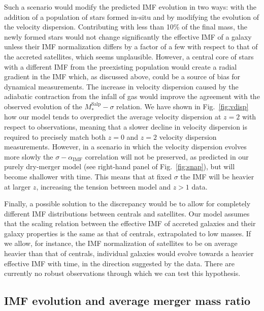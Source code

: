 \documentclass[usenatbib]{mnras}
\def\msalp{M_*^{\mathrm{Salp}}}
\def\aimf{\alpha_{\mathrm{IMF}}}
\def\Fref#1{Fig.~\ref{#1}\xspace}
\begin{document}
Such a scenario would modify the predicted IMF
evolution in two ways: with the addition of a population of stars
formed in-situ and by modifying the evolution of the velocity
dispersion.  Contributing with less than 10\% of the final mass, the
newly formed stars would not change significantly the effective IMF of
a galaxy unless their IMF normalization differs by a factor of a few
with respect to that of the accreted satellites, which seems
unplausible. However, a central core of stars with a different IMF
from the preexisting population would create a radial gradient in the
IMF which, as discussed above, could be a source of bias for dynamical
measurements.  The increase in velocity dispersion caused by the
adiabatic contraction from the infall of gas would improve the
agreement with the observed evolution of the $\msalp-\sigma$ relation.
We have shown in \Fref{fig:vdisp} how our model tends to overpredict
the average velocity dispersion at $z=2$ with respect to observations,
meaning that a slower decline in velocity dispersion is required to
precisely match both $z=0$ and $z=2$ velocity dispersion measurements.
However, in a scenario in which the velocity dispersion evolves more
slowly the $\sigma-\aimf$ correlation will not be preserved, as
predicted in our purely dry-merger model (see right-hand panel of
\Fref{fig:snap}), but will become shallower with time. This means that
at fixed $\sigma$ the IMF will be heavier at larger $z$, increasing
the tension between model and $z>1$ data.

Finally, a possible solution to the discrepancy would be to allow for completely different IMF distributions between centrals and satellites. Our model assumes that the scaling relation between the effective IMF of accreted galaxies and their galaxy properties is the same as that of centrals, extrapolated to low masses.
If we allow, for instance, the IMF normalization of satellites to be on average heavier than that of centrals, individual galaxies would evolve towards a heavier effective IMF with time, in the direction suggested by the data. There are currently no robust observations through which we can test this hypothesis.

\subsection{IMF evolution and average merger mass ratio}
\end{document}
